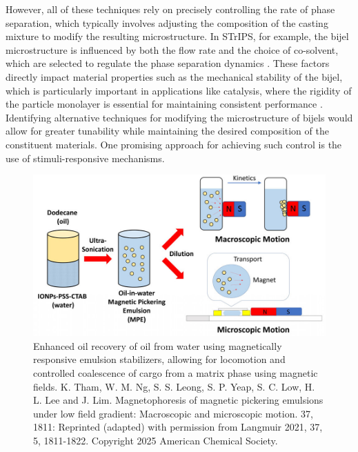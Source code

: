 However, all of these techniques rely on precisely controlling the rate of phase separation, which typically involves adjusting the composition 
of the casting mixture to modify the resulting microstructure. In STrIPS, for example, the bijel microstructure is influenced by both the flow rate 
and the choice of co-solvent, which are selected to regulate the phase separation dynamics \cite{haase_continuous_2015}. These factors directly 
impact material properties such as the mechanical stability of the bijel, which is particularly important in applications like catalysis, where the 
rigidity of the particle monolayer is essential for maintaining consistent performance 
\cite{reeves_particle-size_2015, haase_situ_2016, boakye-ansah_controlling_2020}. Identifying alternative techniques for modifying the microstructure of 
bijels would allow for greater tunability while maintaining the desired composition of the constituent materials. One promising approach for achieving 
such control is the use of stimuli-responsive mechanisms.  

\begin{figure}[h]
    \centering
    \includegraphics[scale = 1.5]{figures/introduction/magnetophoresis_emulsion.jpeg}
    \caption{Enhanced oil recovery of oil from water using magnetically responsive emulsion stabilizers, allowing for 
             locomotion and controlled coalescence of cargo from a matrix phase using magnetic fields. \cite{tham_magnetophoresis_2021} 
             K. Tham, W. M. Ng, S. S. Leong, S. P. Yeap, S. C. Low, H. L. Lee and J. Lim. Magnetophoresis of magnetic pickering 
             emulsions under low field gradient: Macroscopic and microscopic motion. 37, 1811: Reprinted (adapted) with permission from 
             Langmuir 2021, 37, 5, 1811-1822. Copyright 2025 American Chemical Society.}
    \label{fig:magnetophoresis_droplet}
\end{figure}

